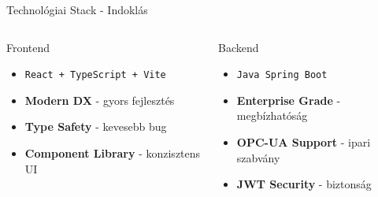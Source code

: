 \documentclass[aspectratio=169,10pt]{beamer}
\newcommand{\highlight}[1]{\textcolor{virtplc-blue}{\textbf{#1}}}
\newcommand{\tech}[1]{\texttt{#1}}
\begin{document}
\begin{frame}{Technológiai Stack - Indoklás}
    \begin{columns}[c]
        \begin{block}{Frontend}
            \begin{itemize}
                \item \tech{React + TypeScript + Vite}
                \item \highlight{Modern DX} - gyors fejlesztés
                \item \highlight{Type Safety} - kevesebb bug
                \item \highlight{Component Library} - konzisztens UI
            \end{itemize}
        \end{block}
        
        \begin{block}{Backend}
            \begin{itemize}
                \item \tech{Java Spring Boot}
                \item \highlight{Enterprise Grade} - megbízhatóság
                \item \highlight{OPC-UA Support} - ipari szabvány
                \item \highlight{JWT Security} - biztonság
            \end{itemize}
        \end{block}
    \end{columns}
\end{frame}
\end{document}
